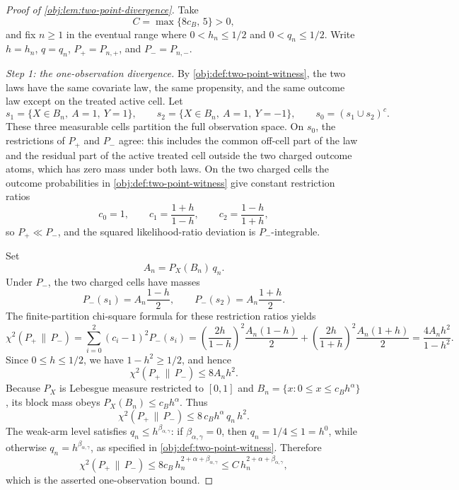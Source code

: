 \documentclass[11pt]{article}
\begin{document}
\begin{proof}[Proof of \cref{obj:lem:two-point-divergence}]
Take
\[
C=\max\{8c_B,\,5\}>0,
\]
and fix \(n\ge1\) in the eventual range where \(0<h_n\le1/2\) and \(0<q_n\le1/2\).  Write \(h=h_n\), \(q=q_n\), \(P_+=P_{n,+}\), and \(P_-=P_{n,-}\).

\emph{Step 1: the one-observation divergence.}  By \cref{obj:def:two-point-witness}, the two laws have the same covariate law, the same propensity, and the same outcome law except on the treated active cell.  Let
\[
s_1=\{X\in B_n,\ A=1,\ Y=1\},
\qquad
s_2=\{X\in B_n,\ A=1,\ Y=-1\},
\qquad
s_0=(s_1\cup s_2)^c .
\]
These three measurable cells partition the full observation space.  On \(s_0\), the restrictions of \(P_+\) and \(P_-\) agree: this includes the common off-cell part of the law and the residual part of the active treated cell outside the two charged outcome atoms, which has zero mass under both laws.  On the two charged cells the outcome probabilities in \cref{obj:def:two-point-witness} give constant restriction ratios
\[
c_0=1,
\qquad
c_1=\frac{1+h}{1-h},
\qquad
c_2=\frac{1-h}{1+h},
\]
so \(P_+\ll P_-\), and the squared likelihood-ratio deviation is \(P_-\)-integrable.

Set
\[
A_n=P_X(B_n)\,q_n .
\]
Under \(P_-\), the two charged cells have masses
\[
P_-(s_1)=A_n\frac{1-h}{2},
\qquad
P_-(s_2)=A_n\frac{1+h}{2}.
\]
The finite-partition chi-square formula for these restriction ratios yields
\[
\chi^2(P_+\,\|\,P_-)
=
\sum_{i=0}^2(c_i-1)^2P_-(s_i)
=
\left(\frac{2h}{1-h}\right)^2\frac{A_n(1-h)}2
+
\left(\frac{2h}{1+h}\right)^2\frac{A_n(1+h)}2
=
\frac{4A_nh^2}{1-h^2}.
\]
Since \(0\le h\le1/2\), we have \(1-h^2\ge1/2\), and hence
\[
\chi^2(P_+\,\|\,P_-)
\le 8A_nh^2 .
\]
Because \(P_X\) is Lebesgue measure restricted to \([0,1]\) and \(B_n=\{x:0\le x\le c_Bh^\alpha\}\), its block mass obeys \(P_X(B_n)\le c_Bh^\alpha\).  Thus
\[
\chi^2(P_+\,\|\,P_-)
 \le 8\,c_Bh^\alpha\,q_n\,h^2 .
\]
The weak-arm level satisfies \(q_n\le h^{\beta_{\alpha,\gamma}}\): if \(\beta_{\alpha,\gamma}=0\), then \(q_n=1/4\le1=h^0\), while otherwise \(q_n=h^{\beta_{\alpha,\gamma}}\), as specified in \cref{obj:def:two-point-witness}.  Therefore
\[
\chi^2(P_+\,\|\,P_-)
 \le 8c_B\,h_n^{2+\alpha+\beta_{\alpha,\gamma}}
 \le C\,h_n^{2+\alpha+\beta_{\alpha,\gamma}},
\]
which is the asserted one-observation bound. %


\end{proof}
\end{document}
